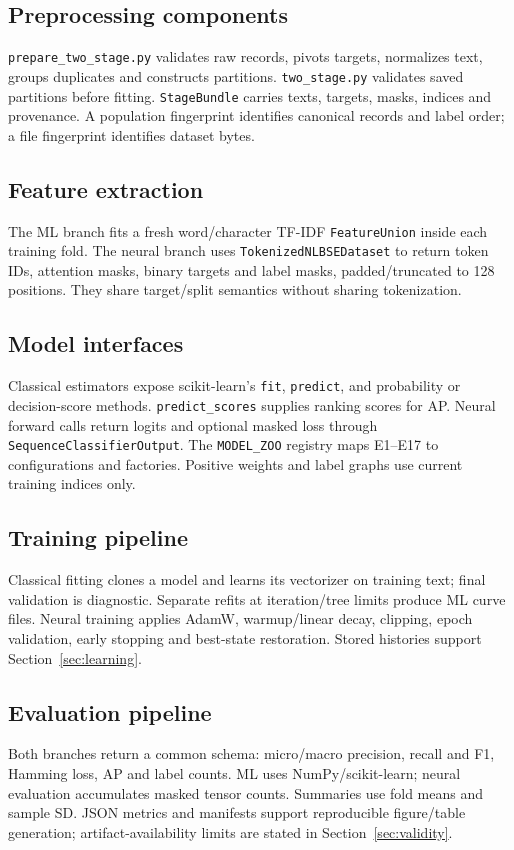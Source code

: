 \subsection{Preprocessing components}
\texttt{prepare\_two\_stage.py} validates raw records, pivots targets, normalizes text, groups duplicates and constructs partitions. \texttt{two\_stage.py} validates saved partitions before fitting. \texttt{StageBundle} carries texts, targets, masks, indices and provenance. A population fingerprint identifies canonical records and label order; a file fingerprint identifies dataset bytes.

\subsection{Feature extraction}
The ML branch fits a fresh word/character TF-IDF \texttt{FeatureUnion} inside each training fold. The neural branch uses \texttt{TokenizedNLBSEDataset} to return token IDs, attention masks, binary targets and label masks, padded/truncated to 128 positions. They share target/split semantics without sharing tokenization.

\subsection{Model interfaces}
Classical estimators expose scikit-learn's \texttt{fit}, \texttt{predict}, and probability or decision-score methods. \texttt{predict\_scores} supplies ranking scores for AP. Neural forward calls return logits and optional masked loss through \texttt{SequenceClassifierOutput}. The \texttt{MODEL\_ZOO} registry maps E1--E17 to configurations and factories. Positive weights and label graphs use current training indices only.

\subsection{Training pipeline}
Classical fitting clones a model and learns its vectorizer on training text; final validation is diagnostic. Separate refits at iteration/tree limits produce ML curve files. Neural training applies AdamW, warmup/linear decay, clipping, epoch validation, early stopping and best-state restoration. Stored histories support Section~\ref{sec:learning}.

\subsection{Evaluation pipeline}
Both branches return a common schema: micro/macro precision, recall and F1, Hamming loss, AP and label counts. ML uses NumPy/scikit-learn; neural evaluation accumulates masked tensor counts. Summaries use fold means and sample SD. JSON metrics and manifests support reproducible figure/table generation; artifact-availability limits are stated in Section~\ref{sec:validity}.


